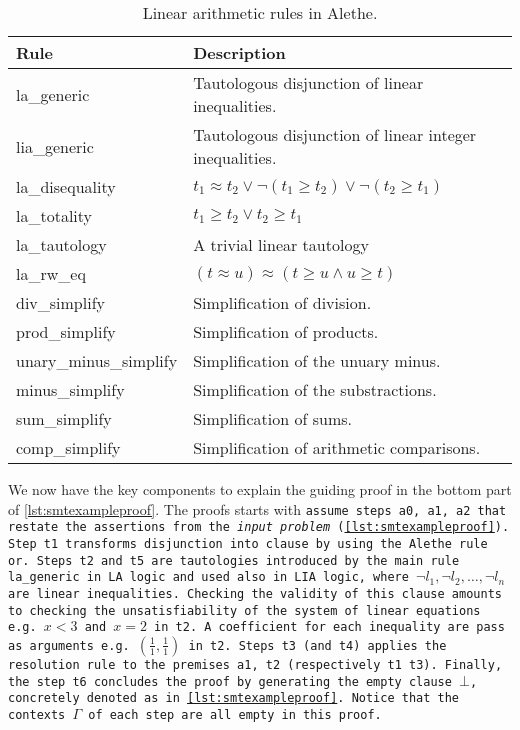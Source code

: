 \begin{table}[]
    \centering
    \begin{tabular}{ll}
    Rule & Description \\ \hline
    la\_generic & Tautologous disjunction of linear inequalities. \\
    lia\_generic & Tautologous disjunction of linear integer inequalities. \\
    la\_disequality & $t_1 \approx t_2 \lor \neg (t_1 \geq t_2) \lor \neg (t_2 \geq t_1)$ \\
    la\_totality & $t_1 \geq t_2 \lor t_2 \geq t_1$ \\
    la\_tautology & A trivial linear tautology \\
    la\_rw\_eq & $(t \approx u) \approx (t \geq u \land u \geq t)$ \\
    div\_simplify & Simplification of division. \\
    prod\_simplify & Simplification of products. \\
    unary\_minus\_simplify & Simplification of the unuary minus. \\
    minus\_simplify & Simplification of the substractions. \\
    sum\_simplify & Simplification of sums. \\
    comp\_simplify & Simplification of arithmetic comparisons. \\
    \end{tabular}
    \caption{Linear arithmetic rules in Alethe.}
    \label{table:linear-arith-rules}
\end{table}

We now have the key components to explain the guiding proof in the bottom part of \cref{lst:smtexampleproof}.
The proofs starts with \tt{assume} steps \tt{a0}, \tt{a1}, \tt{a2} that restate the assertions from the \textit{input problem} (\cref{lst:smtexampleproof}).
Step \tt{t1} transforms disjunction into clause by using the Alethe rule \tt{or}.
Steps \tt{t2} and \tt{t5} are tautologies introduced by the main rule \tt{la\_generic}
in LA logic and used also in LIA logic, where \colorbox{green!30}{$\neg l_1, \neg l_2,\dots, \neg l_n$} are linear inequalities. Checking the validity of this clause amounts to checking the unsatisfiability of the
system of linear equations e.g. $x < 3$ and $x = 2$ in \tt{t2}. A coefficient for each inequality are pass as arguments e.g. $(\frac{1}{1},\frac{1}{1})$ in \tt{t2}.
Steps \tt{t3} (and \tt{t4}) applies the \colorbox{purple!30}{\texttt{resolution}} rule to the premises \tt{a1}, \tt{t2} (respectively \tt{t1} \tt{t3}).
Finally, the step \texttt{t6} concludes the proof by generating the empty clause $\bot$, concretely denoted as  in \cref{lst:smtexampleproof}. %
Notice that the contexts \colorbox{blue!30}{$\Gamma$} of each step are all empty in this proof.


